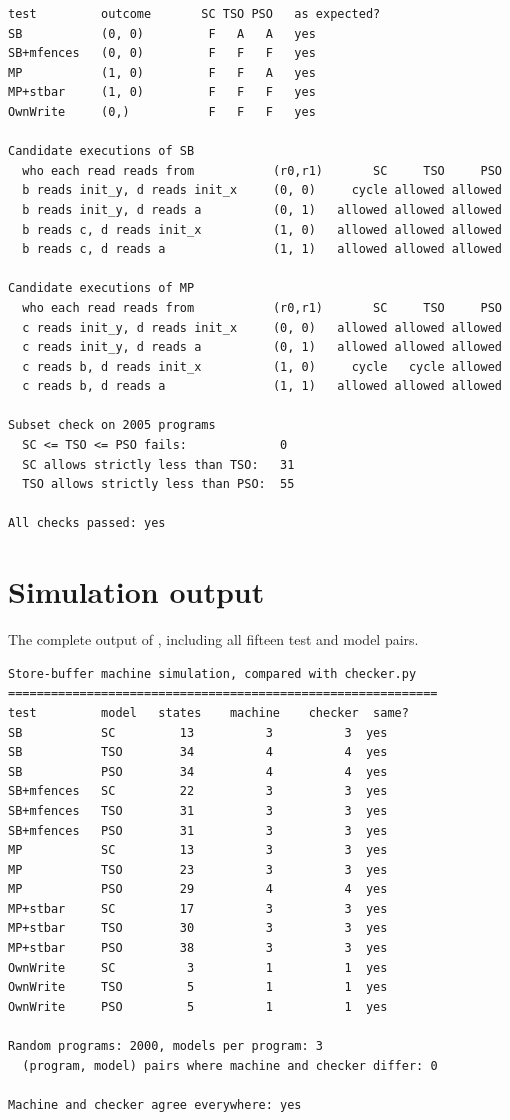 \begin{lstlisting}[style=vscode,numbers=none,basicstyle=\ttfamily\scriptsize\color{vsfg}]
test         outcome       SC TSO PSO   as expected?
SB           (0, 0)         F   A   A   yes
SB+mfences   (0, 0)         F   F   F   yes
MP           (1, 0)         F   F   A   yes
MP+stbar     (1, 0)         F   F   F   yes
OwnWrite     (0,)           F   F   F   yes

Candidate executions of SB
  who each read reads from           (r0,r1)       SC     TSO     PSO
  b reads init_y, d reads init_x     (0, 0)     cycle allowed allowed
  b reads init_y, d reads a          (0, 1)   allowed allowed allowed
  b reads c, d reads init_x          (1, 0)   allowed allowed allowed
  b reads c, d reads a               (1, 1)   allowed allowed allowed

Candidate executions of MP
  who each read reads from           (r0,r1)       SC     TSO     PSO
  c reads init_y, d reads init_x     (0, 0)   allowed allowed allowed
  c reads init_y, d reads a          (0, 1)   allowed allowed allowed
  c reads b, d reads init_x          (1, 0)     cycle   cycle allowed
  c reads b, d reads a               (1, 1)   allowed allowed allowed

Subset check on 2005 programs
  SC <= TSO <= PSO fails:             0
  SC allows strictly less than TSO:   31
  TSO allows strictly less than PSO:  55

All checks passed: yes
\end{lstlisting}

\section{Simulation output}
The complete output of , including all fifteen test and model pairs.

\begin{lstlisting}[style=vscode,numbers=none,basicstyle=\ttfamily\scriptsize\color{vsfg}]
Store-buffer machine simulation, compared with checker.py
============================================================
test         model   states    machine    checker  same?
SB           SC         13          3          3  yes
SB           TSO        34          4          4  yes
SB           PSO        34          4          4  yes
SB+mfences   SC         22          3          3  yes
SB+mfences   TSO        31          3          3  yes
SB+mfences   PSO        31          3          3  yes
MP           SC         13          3          3  yes
MP           TSO        23          3          3  yes
MP           PSO        29          4          4  yes
MP+stbar     SC         17          3          3  yes
MP+stbar     TSO        30          3          3  yes
MP+stbar     PSO        38          3          3  yes
OwnWrite     SC          3          1          1  yes
OwnWrite     TSO         5          1          1  yes
OwnWrite     PSO         5          1          1  yes

Random programs: 2000, models per program: 3
  (program, model) pairs where machine and checker differ: 0

Machine and checker agree everywhere: yes
\end{lstlisting}

